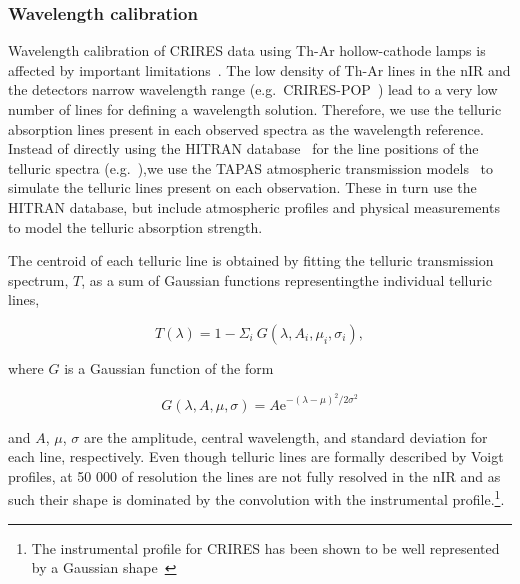 \documentclass[fleqn,usenatbib]{mnras}
\newcommand*\bl{\color{blue}}
\begin{document}
    \subsubsection{Wavelength calibration}
    \label{subsec:wave_cal}
    {\bl Wavelength calibration of CRIRES data using Th-Ar hollow-cathode lamps is affected by important limitations~\citep{kerber_laboratory_2009}. The low density of Th-Ar lines in the nIR and the detectors narrow wavelength range (e.g.\ CRIRES-POP~\citep{nicholls_crirespop_2017}) lead to a very low number of lines for defining a wavelength solution.}
    Therefore, we use the telluric absorption lines present in each observed spectra as the wavelength reference. Instead of directly using the HITRAN database~\citep{rothman_hitran2012_2013} for the line positions of the telluric spectra (e.g.~\citep{brogi_signature_2012,brogi_carbon_2014,dekok_detection_2013}),{\bl we use the TAPAS atmospheric transmission models~\citep{bertaux_tapas_2014} to simulate the telluric lines present on each observation.} These in turn use the HITRAN database, but include atmospheric profiles and physical measurements to model the telluric absorption strength.
    
    The centroid of each telluric line is obtained by fitting the telluric transmission spectrum, \(T\), as a sum of Gaussian functions representing{\bl the individual} telluric lines,
    
    \begin{equation}
    T(\lambda) = 1 - {\Sigma}_{i}\ G(\lambda, A_{i}, {\mu}_{i}, {\sigma}_{i}),
    \end{equation}
    
    where \(G\) is a Gaussian function of the form
    
    \begin{equation}
    G(\lambda, A, \mu, \sigma) = {A \textrm{e}}^{{-(\lambda-\mu)}^{2}/2\sigma^{2}}
    \end{equation}
    
    and \(A\), \(\mu\), \(\sigma\) are the amplitude, central wavelength, and standard deviation for each line, respectively. {\bl Even though telluric lines are formally described by Voigt profiles, at 50 000 of resolution the lines are not fully resolved in the nIR and as such their shape is dominated by the convolution with the instrumental profile.\footnote{The instrumental profile for CRIRES has been shown to be well represented by a Gaussian shape~\citep{seifahrt_synthesising_2010}}.}
    
\end{document}

